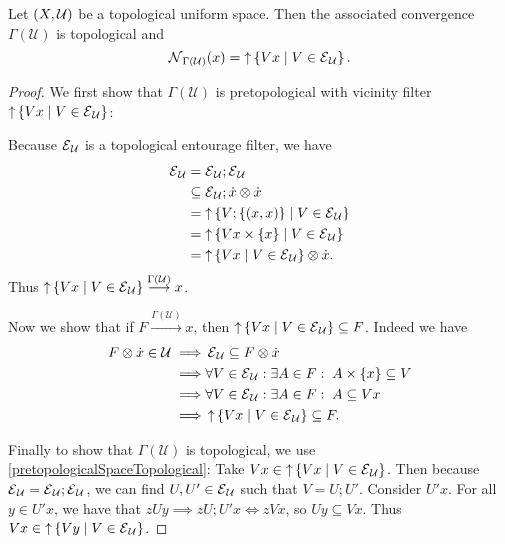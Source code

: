 \begin{proposition} \label{topologicalInducedUniformConvergence}
Let $\left( X,\mathcal{U} \right)$ be a topological uniform space. Then the associated convergence $\Gamma(\mathcal{U})$ is topological and
\[ \operatorname{\mathcal{N}}_{\Gamma(\mathcal{U})}(x) = \operatorname{\uparrow} \left\{ V x \;\middle|\; V\in \operatorname{\mathcal{E}}_\mathcal{U} \right\}. \]
\end{proposition}
\begin{proof}
We first show that $\Gamma(\mathcal{U})$ is pretopological with vicinity filter $\operatorname{\uparrow} \left\{ V x \;\middle|\; V\in \operatorname{\mathcal{E}}_\mathcal{U} \right\}$:

Because $\operatorname{\mathcal{E}}_\mathcal{U}$ is a topological entourage filter, we have
\begin{align*}
\operatorname{\mathcal{E}}_\mathcal{U} &= \operatorname{\mathcal{E}}_\mathcal{U};\operatorname{\mathcal{E}}_\mathcal{U} \\
&\subseteq \operatorname{\mathcal{E}}_\mathcal{U}; \dot{x}\otimes \dot{x} \\
&= \operatorname{\uparrow} \left\{ V; \{(x,x)\} \;\middle|\; V\in \operatorname{\mathcal{E}}_\mathcal{U} \right\} \\
&= \operatorname{\uparrow} \left\{ V x\times\{x\} \;\middle|\; V\in \operatorname{\mathcal{E}}_\mathcal{U} \right\} \\
&= \operatorname{\uparrow} \left\{ V x \;\middle|\; V\in \operatorname{\mathcal{E}}_\mathcal{U} \right\}\otimes \dot{x}.
\end{align*}
Thus $\operatorname{\uparrow} \left\{ V x \;\middle|\; V\in \operatorname{\mathcal{E}}_\mathcal{U} \right\} \overset{\Gamma(\mathcal{U})}{\longrightarrow} x$.

Now we show that if $F\overset{\Gamma(\mathcal{U})}{\longrightarrow} x$, then $\operatorname{\uparrow} \left\{ V x \;\middle|\; V\in \operatorname{\mathcal{E}}_\mathcal{U} \right\}\subseteq F$. Indeed we have
\begin{align*}
F\otimes \dot{x}\in \mathcal{U} \implies& \operatorname{\mathcal{E}}_\mathcal{U}\subseteq F\otimes \dot{x} \\
\implies& \forall V\in \operatorname{\mathcal{E}}_\mathcal{U}: \exists A\in F: \; A\times \{x\} \subseteq V \\
\implies& \forall  V\in \operatorname{\mathcal{E}}_\mathcal{U}: \exists A\in F: \; A \subseteq V x \\
\implies& \operatorname{\uparrow} \left\{ V x \;\middle|\; V\in \operatorname{\mathcal{E}}_\mathcal{U} \right\}\subseteq F.
\end{align*}

Finally to show that $\Gamma(\mathcal{U})$ is topological, we use \ref{pretopologicalSpaceTopological}: Take $Vx\in \operatorname{\uparrow} \left\{ V x \;\middle|\; V\in \operatorname{\mathcal{E}}_\mathcal{U} \right\}$. Then because $\operatorname{\mathcal{E}}_\mathcal{U} = \operatorname{\mathcal{E}}_\mathcal{U};\operatorname{\mathcal{E}}_\mathcal{U}$, we can find $U,U'\in \operatorname{\mathcal{E}}_\mathcal{U}$ such that $V = U;U'$. Consider $U'x$. For all $y\in U'x$, we have that $zUy \implies zU;U'x \iff zVx$, so $Uy \subseteq Vx$. Thus $Vx \in \operatorname{\uparrow} \left\{ V y \;\middle|\; V\in \operatorname{\mathcal{E}}_\mathcal{U} \right\}$.
\end{proof}


